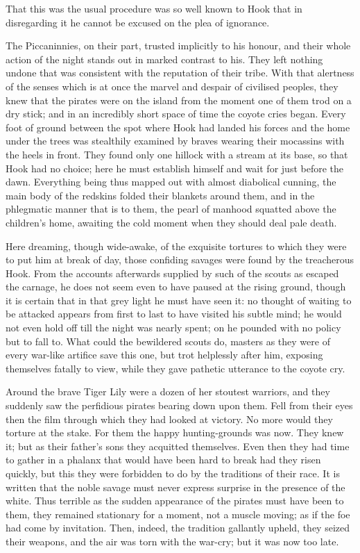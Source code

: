 That this was the usual procedure was so well known to Hook that in
disregarding it he cannot be excused on the plea of ignorance.

The Piccaninnies, on their part, trusted implicitly to his honour, and
their whole action of the night stands out in marked contrast to his.
They left nothing undone that was consistent with the reputation of
their tribe. With that alertness of the senses which is at once the
marvel and despair of civilised peoples, they knew that the pirates
were on the island from the moment one of them trod on a dry stick; and
in an incredibly short space of time the coyote cries began. Every foot
of ground between the spot where Hook had landed his forces and the
home under the trees was stealthily examined by braves wearing their
mocassins with the heels in front. They found only one hillock with a
stream at its base, so that Hook had no choice; here he must establish
himself and wait for just before the dawn. Everything being thus mapped
out with almost diabolical cunning, the main body of the redskins
folded their blankets around them, and in the phlegmatic manner that is
to them, the pearl of manhood squatted above the children's home,
awaiting the cold moment when they should deal pale death.

Here dreaming, though wide-awake, of the exquisite tortures to which
they were to put him at break of day, those confiding savages were
found by the treacherous Hook. From the accounts afterwards supplied by
such of the scouts as escaped the carnage, he does not seem even to
have paused at the rising ground, though it is certain that in that
grey light he must have seen it: no thought of waiting to be attacked
appears from first to last to have visited his subtle mind; he would
not even hold off till the night was nearly spent; on he pounded with
no policy but to fall to. What could the bewildered scouts do, masters
as they were of every war-like artifice save this one, but trot
helplessly after him, exposing themselves fatally to view, while they
gave pathetic utterance to the coyote cry.

Around the brave Tiger Lily were a dozen of her stoutest warriors, and
they suddenly saw the perfidious pirates bearing down upon them. Fell
from their eyes then the film through which they had looked at victory.
No more would they torture at the stake. For them the happy
hunting-grounds was now. They knew it; but as their father's sons they
acquitted themselves. Even then they had time to gather in a phalanx
that would have been hard to break had they risen quickly, but this
they were forbidden to do by the traditions of their race. It is
written that the noble savage must never express surprise in the
presence of the white. Thus terrible as the sudden appearance of the
pirates must have been to them, they remained stationary for a moment,
not a muscle moving; as if the foe had come by invitation. Then,
indeed, the tradition gallantly upheld, they seized their weapons, and
the air was torn with the war-cry; but it was now too late.


